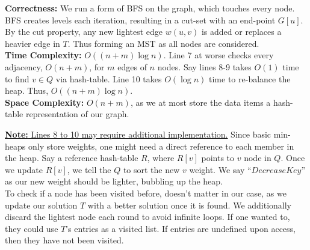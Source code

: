 \begin{Func}
    \noindent
    \textbf{Correctness:} We run a form of BFS on the graph, which touches every node. BFS creates levels each iteration, resulting in a cut-set with an end-point $G[u]$.
    By the cut property, any new lightest edge $w(u,v)$ is added or replaces a heavier edge in $T$. Thus forming an MST as all nodes are considered.\\
    \textbf{Time Complexity:} $O((n+m)\log n)$. Line 7 at worse checks every adjacency, $O(n+m)$, for $m$ edges of $n$ nodes. 
    Say lines 8-9 takes $O(1)$ time to find $v\in Q$ via hash-table. Line 10 takes $O(\log n)$ time to re-balance the heap.
    Thus, $O((n+m)\log n)$.\\
    \textbf{Space Complexity:} $O(n+m)$, as we at most store the data items a hash-table representation of our graph.
\end{Func}

\noindent
\underline{\textbf{Note:} Lines 8 to 10 may require additional implementation.} Since basic min-heaps only store weights, one 
might need a direct reference to each member in the heap. Say a reference hash-table $R$, where $R[v]$ 
points to $v$ node in $Q$. Once we update $R[v]$, we tell the $Q$ to sort the new $v$ weight. We say
``$DecreaseKey$'' as our new weight should be lighter, bubbling up the heap.\\

\noindent
To check if a node has been visited before, doesn't matter in our case, as we update our solution $T$ with 
a better solution once it is found. We additionally discard the lightest node each round to avoid infinite loops. If one wanted to, they could use $T$'s entries as a visited list. If entries are
undefined upon access, then they have not been visited.\\


